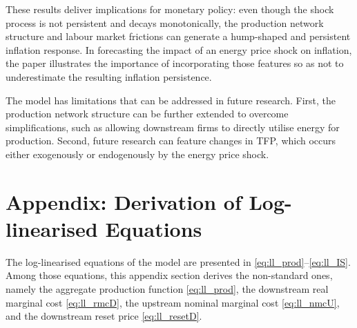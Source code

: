 \documentclass[a4paper, 12pt]{article}
\theoremstyle{definition*}
\begin{document}
These results deliver implications for monetary policy: even though the shock process is not persistent and decays monotonically, the production network structure and labour market frictions can generate a hump-shaped and persistent inflation response.
In forecasting the impact of an energy price shock on inflation, the paper illustrates the importance of incorporating those features so as not to underestimate the resulting inflation persistence.

The model has limitations that can be addressed in future research.
First, the production network structure can be further extended to overcome simplifications, such as allowing downstream firms to directly utilise energy for production.
Second, future research can feature changes in TFP, which occurs either exogenously or endogenously by the energy price shock.




\newpage

\appendix
\renewcommand{\theequation}{A.\arabic{equation}}
\setcounter{equation}{0}
\renewcommand{\thefigure}{A.\arabic{figure}}
\setcounter{figure}{0}
\renewcommand{\thetable}{A.\arabic{table}}
\setcounter{table}{0}

\section{Appendix: Derivation of Log-linearised Equations}\label{sec:appendix-derivation}
The log-linearised equations of the model are presented in \eqref{eq:ll_prod}--\eqref{eq:ll_IS}.
Among those equations, this appendix section derives the non-standard ones, namely the aggregate production function \eqref{eq:ll_prod}, the downstream real marginal cost \eqref{eq:ll_rmcD}, the upstream nominal marginal cost \eqref{eq:ll_nmcU}, and the downstream reset price \eqref{eq:ll_resetD}.
\end{document}
